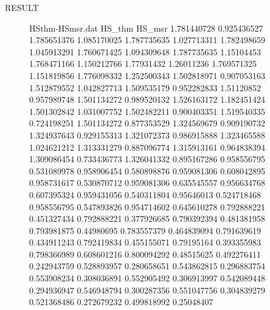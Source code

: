 \documentclass[a0paper,portrait]{Junlam_PosterP}
\begin{document}
\begin{poster}
\begin{posterbox}[name=result,column=2,below=wtank]{RESULT}
    \begin{figure}[H]
        \begin{filecontents}{HSthm-HSmsr.dat}
                HS_thm	HS_msr
                1.781440728	0.925436527
                1.785651376	1.085170025
                1.787735635	1.027713311
                1.782498659	1.045913291
                1.760671425	1.094309648
                1.787735635	1.15104453
                1.768471166	1.150212766
                1.77931432	1.26011236
                1.769571325	1.151819856
                1.776098332	1.252500343
                1.502818971	0.907053163
                1.512879552	1.042827713
                1.509535179	0.952282833
                1.51120852	0.957989748
                1.501134272	0.989520132
                1.526163172	1.182451424
                1.501302842	1.031007752
                1.502482211	0.900403351
                1.519540335	0.724198251
                1.501134272	0.877353529
                1.324569679	0.909190732
                1.324937643	0.929155313
                1.321072373	0.986915888
                1.323465588	1.024621212
                1.313331279	0.887096774
                1.315913161	0.964838394
                1.309086454	0.733436773
                1.326041332	0.895167286
                0.958556795	0.531089978
                0.958906454	0.580898876
                0.959081306	0.608042895
                0.958731617	0.530870712
                0.959081306	0.635545557
                0.956634768	0.607395324
                0.959431056	0.540311804
                0.95646013	0.524718468
                0.958556795	0.547893826
                0.954714602	0.645610278
                0.792888221	0.451327434
                0.792888221	0.377926685
                0.790392394	0.481381958
                0.793981875	0.44980695
                0.783557379	0.464839094
                0.791639619	0.434911243
                0.792419834	0.455155071
                0.79195164	0.393355983
                0.798366989	0.608601216
                0.800094292	0.48515625
                0.492276411	0.242943759
                0.528893957	0.280658651
                0.543862815	0.296883754
                0.553908234	0.308036891
                0.552905492	0.306913997
                0.542089448	0.294936947
                0.546948794	0.300287356
                0.551047756	0.304839279
                0.521368486	0.272679232
                0.499818992	0.25048407                  
            \end{filecontents}


\end{figure}
\end{posterbox}
\end{poster}
\end{document}
